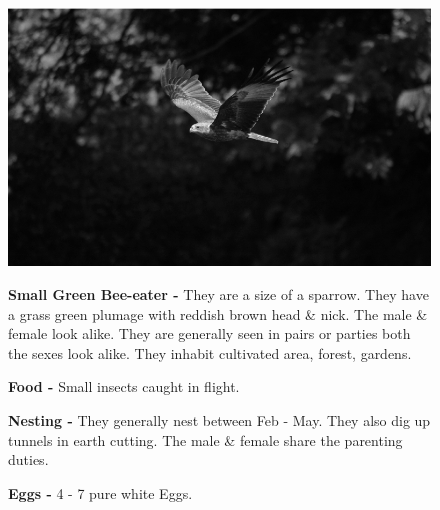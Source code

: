 \begin{figure}[H]
\begin{center}
\includegraphics{figure/Land_birds/01_pariah_kite/pariah-kite.eps}
\end{center}
\medskip
\noindent
{\bf Small Green Bee-eater -} They are a size of a sparrow. They have a grass green plumage with reddish brown head \& nick. The male \& female look alike. They are generally seen in pairs or parties both the sexes look alike. They inhabit cultivated area, forest, gardens.

\medskip
{\bf Food -} Small insects caught in flight.

{\bf Nesting -} They generally nest between Feb - May. They also dig up tunnels in earth cutting. The male \& female share the parenting duties.

{\bf Eggs -} 4 - 7 pure white Eggs.
\end{figure}

\vfill\eject

~\phantom{a}
\vfill

